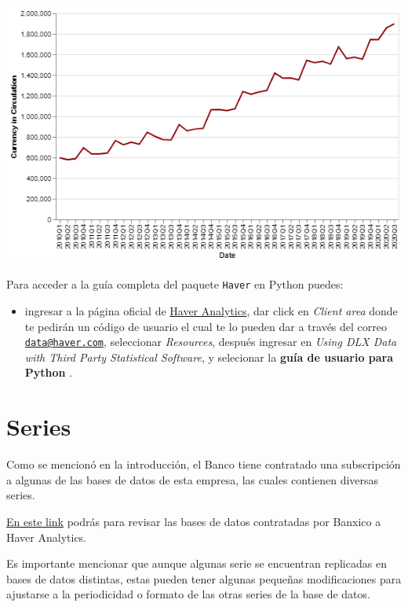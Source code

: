 \documentclass[
]{book}
\providecommand{\tightlist}{%
  \setlength{\itemsep}{0pt}\setlength{\parskip}{0pt}}
\begin{document}
\includegraphics{_img/python_plot.png}

Para acceder a la guía completa del paquete \texttt{Haver} en Python puedes:

\begin{itemize}
\tightlist
\item
  ingresar a la página oficial de \href{http://www.haver.com}{Haver Analytics}, dar click en \emph{Client area} donde te pedirán un código de usuario el cual te lo pueden dar a través del correo \href{mailto:data@haver.com}{\nolinkurl{data@haver.com}}, seleccionar \emph{Resources}, después ingresar en \emph{Using DLX Data with Third Party Statistical Software}, y selecionar la \textbf{guía de usuario para Python} \citep{haver_python}.
\end{itemize}

\hypertarget{series}{%
\chapter{Series}\label{series}}

Como se mencionó en la introducción, el Banco tiene contratado una subscripción a algunas de las bases de datos de esta empresa, las cuales contienen diversas series.

\href{http://webinterno/centro-de-informacion-electronica/acceso-a-recursos-electronicos/bases-de-datos-con-informacion-estadistica/haver-analytics-global/haver-analytics-global--.html}{En este link} podrás para revisar las bases de datos contratadas por Banxico a Haver Analytics.

Es importante mencionar que aunque algunas serie se encuentran replicadas en bases de datos distintas, estas pueden tener algunas pequeñas modificaciones para ajustarse a la periodicidad o formato de las otras series de la base de datos.
\end{document}
